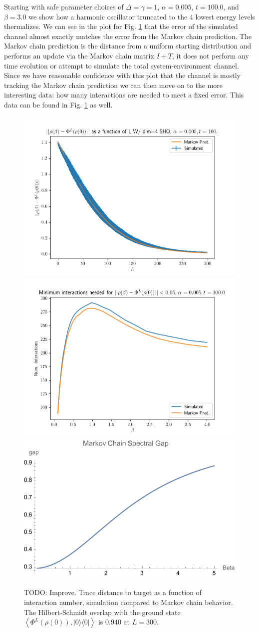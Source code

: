 \documentclass{article}
\newcommand{\ketbra}[2]{| #1\rangle\! \langle #2|}
\newcommand{\anglebrackets}[1]{\left< #1 \right>}
\begin{document}
Starting with safe parameter choices of $\Delta = \gamma = 1$, $\alpha = 0.005$, $t = 100.0$, and $\beta = 3.0$ we show how a harmonic oscillator truncated to the $4$ lowest energy levels thermalizes. We can see in the plot for Fig. \ref{fig:enter-label} that the error of the simulated channel almost exactly matches the error from the Markov chain prediction. The Markov chain prediction is the distance from a uniform starting distribution and performs an update via the Markov chain matrix $I + T$, it does not perform any time evolution or attempt to simulate the total system-environment channel. Since we have reasonable confidence with this plot that the channel is mostly tracking the Markov chain prediction we can then move on to the more interesting data: how many interactions are needed to meet a fixed error. This data can be found in Fig. \ref{fig:enter-label} as well. 
\begin{figure}
    \centering
    \includegraphics[width=0.45\linewidth]{numerics/data/sho_error_vs_l.png}
    \includegraphics[width=0.45\linewidth]{numerics/data/sho_l_vs_beta.png} \\
    \includegraphics[width=0.5\linewidth]{numerics/data/spec_gap_dim_4.pdf}
    \caption{TODO: Improve. Trace distance to target as a function of interaction number, simulation compared to Markov chain behavior. The Hilbert-Schmidt overlap with the ground state $\anglebrackets{\Phi^L(\rho(0)), \ketbra{0}{0}}$ is 0.940 at $L = 300$. }
    \label{fig:enter-label}
\end{figure}
\end{document}

